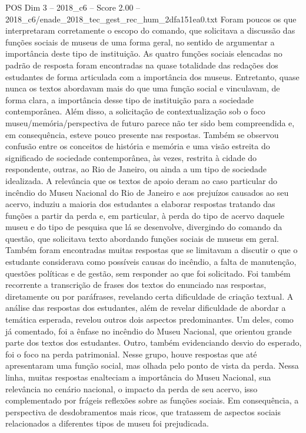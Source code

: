 \begin{textsample}{POS Dim 3 – 2018\_c6 – Score 2.00 – 2018\_c6/enade\_2018\_tec\_gest\_rec\_hum\_2dfa151ea0.txt}
Foram poucos os que interpretaram corretamente o escopo do comando, que solicitava a discussão das funções sociais de museus de uma forma geral, no sentido de argumentar a importância deste tipo de instituição.
As quatro funções sociais elencadas no padrão de resposta foram encontradas na quase totalidade das redações dos estudantes de forma articulada com a importância dos museus.
Entretanto, quase nunca os textos abordavam mais do que uma função social e vinculavam, de forma clara, a importância desse tipo de instituição para a sociedade contemporânea.
Além disso, a solicitação de contextualização sob o foco museu/memória/perspectiva de futuro parece não ter sido bem compreendida e, em consequência, esteve pouco presente nas respostas.
Também se observou confusão entre os conceitos de história e memória e uma visão estreita do significado de sociedade contemporânea, às vezes, restrita à cidade do respondente, outras, ao Rio de Janeiro, ou ainda a um tipo de sociedade idealizada.
A relevância que os textos de apoio deram ao caso particular do incêndio do Museu Nacional do Rio de Janeiro e aos prejuízos causados ao seu acervo, induziu a maioria dos estudantes a elaborar respostas tratando das funções a partir da perda e, em particular, à perda do tipo de acervo daquele museu e do tipo de pesquisa que lá se desenvolve, divergindo do comando da questão, que solicitava texto abordando funções sociais de museus em geral.
Também foram encontradas muitas respostas que se limitavam a discutir o que o estudante considerava como possíveis causas do incêndio, a falta de manutenção, questões políticas e de gestão, sem responder ao que foi solicitado.
Foi também recorrente a transcrição de frases dos textos do enunciado nas respostas, diretamente ou por paráfrases, revelando certa dificuldade de criação textual.
A análise das respostas dos estudantes, além de revelar dificuldade de abordar a temática esperada, revelou outros dois aspectos predominantes.
Um deles, como já comentado, foi a ênfase no incêndio do Museu Nacional, que orientou grande parte dos textos dos estudantes.
Outro, também evidenciando desvio do esperado, foi o foco na perda patrimonial.
Nesse grupo, houve respostas que até apresentaram uma função social, mas olhada pelo ponto de vista da perda.
Nessa linha, muitas respostas enalteciam a importância do Museu Nacional, sua relevância no cenário nacional, o impacto da perda de seu acervo, isso complementado por frágeis reflexões sobre as funções sociais.
Em consequência, a perspectiva de desdobramentos mais ricos, que tratassem de aspectos sociais relacionados a diferentes tipos de museu foi prejudicada.

\end{textsample}
